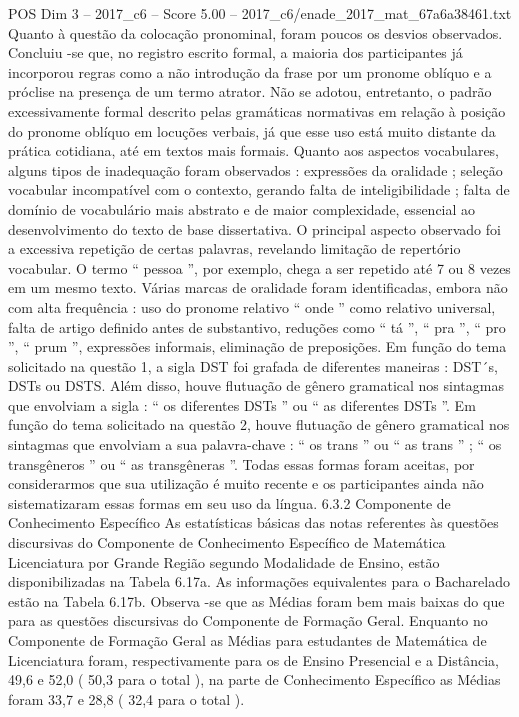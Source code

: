 \begin{textsample}{POS Dim 3 – 2017\_c6 – Score 5.00 – 2017\_c6/enade\_2017\_mat\_67a6a38461.txt}
Quanto à questão da colocação pronominal, foram poucos os desvios observados.
Concluiu -se que, no registro escrito formal, a maioria dos participantes já incorporou regras como a não introdução da frase por um pronome oblíquo e a próclise na presença de um termo atrator.
Não se adotou, entretanto, o padrão excessivamente formal descrito pelas gramáticas normativas em relação à posição do pronome oblíquo em locuções verbais, já que esse uso está muito distante da prática cotidiana, até em textos mais formais.
Quanto aos aspectos vocabulares, alguns tipos de inadequação foram observados : expressões da oralidade ; seleção vocabular incompatível com o contexto, gerando falta de inteligibilidade ; falta de domínio de vocabulário mais abstrato e de maior complexidade, essencial ao desenvolvimento do texto de base dissertativa.
O principal aspecto observado foi a excessiva repetição de certas palavras, revelando limitação de repertório vocabular.
O termo “ pessoa ”, por exemplo, chega a ser repetido até 7 ou 8 vezes em um mesmo texto.
Várias marcas de oralidade foram identificadas, embora não com alta frequência : uso do pronome relativo “ onde ” como relativo universal, falta de artigo definido antes de substantivo, reduções como “ tá ”, “ pra ”, “ pro ”, “ prum ”, expressões informais, eliminação de preposições.
Em função do tema solicitado na questão 1, a sigla DST foi grafada de diferentes maneiras : DST´s, DSTs ou DSTS.
Além disso, houve flutuação de gênero gramatical nos sintagmas que envolviam a sigla : “ os diferentes DSTs ” ou “ as diferentes DSTs ”.
Em função do tema solicitado na questão 2, houve flutuação de gênero gramatical nos sintagmas que envolviam a sua palavra-chave : “ os trans ” ou “ as trans ” ; “ os transgêneros ” ou “ as transgêneras ”.
Todas essas formas foram aceitas, por considerarmos que sua utilização é muito recente e os participantes ainda não sistematizaram essas formas em seu uso da língua. 6.3.2 Componente de Conhecimento Específico As estatísticas básicas das notas referentes às questões discursivas do Componente de Conhecimento Específico de Matemática Licenciatura por Grande Região segundo Modalidade de Ensino, estão disponibilizadas na Tabela 6.17a.
As informações equivalentes para o Bacharelado estão na Tabela 6.17b.
Observa -se que as Médias foram bem mais baixas do que para as questões discursivas do Componente de Formação Geral.
Enquanto no Componente de Formação Geral as Médias para estudantes de Matemática de Licenciatura foram, respectivamente para os de Ensino Presencial e a Distância, 49,6 e 52,0 ( 50,3 para o total ), na parte de Conhecimento Específico as Médias foram 33,7 e 28,8 ( 32,4 para o total ).

\end{textsample}
